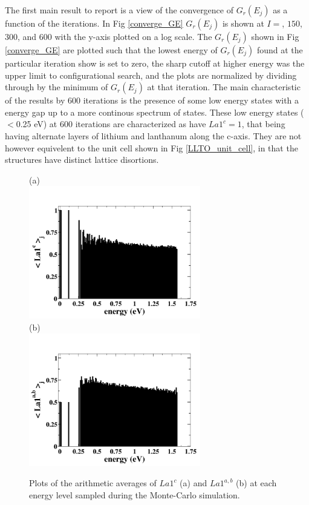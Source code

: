 \documentclass[aps,prl,reprint,superscriptaddress,showkeys]{revtex4-1}
\begin{document}
The first main result to report is a view of the convergence of $G_r(E_j)$ as a function of the iterations. In Fig \ref{converge_GE} $G_r(E_j)$ is shown at  $I=$, $150$, $300$, and $600$ with the y-axis plotted on a log scale. The  $G_r(E_j)$ shown in Fig \ref{converge_GE} are plotted such that the lowest energy of $G_r(E_j)$ found at the particular iteration show is set to zero, the sharp cutoff at higher energy was the upper limit to configurational search, and the plots are normalized by dividing through by the minimum of $G_r(E_j)$ at that iteration.  The main characteristic of the results by 600 iterations is the presence of some low energy states with a energy gap up to a more continous spectrum of states. These low energy states ($<$0.25 eV) at 600 iterations are characterized as have $La1^c=1$, that being having alternate layers of lithium and lanthanum along the c-axis. They are not however equivelent to the unit cell shown in Fig \ref{LLTO_unit_cell}, in that the structures have distinct lattice disortions. 

\begin{figure}[h!]
(a)  \\
\includegraphics[width=7.5cm]{./figures/avg_OP_La1c.png}\\
(b)\\
\includegraphics[width=7.5cm]{./figures/avg_OP_La1ab.png}\\
\caption{Plots of the arithmetic averages of $La1^c$ (a) and $La1^{a,b}$ (b) at each energy level sampled during the Monte-Carlo simulation. \label{arithmetic}}
\end{figure}
\end{document}
